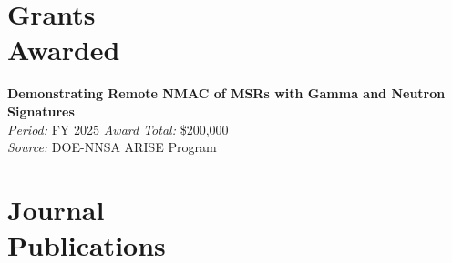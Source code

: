 \documentclass[margin,line]{resume}
\begin{document}
\begin{resume}
    \section{\mysidestyle Grants\\Awarded}
    \textbf{Demonstrating Remote NMAC of MSRs with Gamma and Neutron Signatures} \\
    \textsl{Period:} FY 2025 \hfill \textsl{Award Total:} \$200,000\\
    \textsl{Source:} DOE-NNSA ARISE Program \hfill\\

    \section{\mysidestyle Journal\\Publications}
      \begin{bibenum}
      \item {}
      \item {}
      \item {}
      \end{bibenum}


\end{resume}
\end{document}
